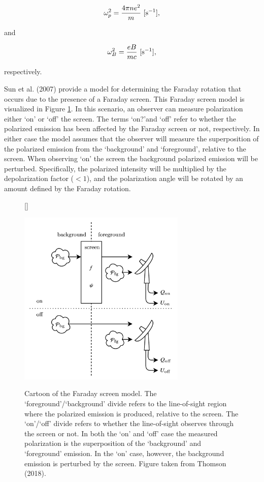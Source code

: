 \documentclass[a4paper,10pt]{article}
\begin{document}
\begin{align*}
	\omega_p^2 = \frac{4\pi ne^2}{m} ~ [{\rm s^{-1}}],
\end{align*}

{\noindent}and

\begin{align*}
	\omega_B^2 = \frac{eB}{mc} ~ [{\rm s^{-1}}],
\end{align*}

{\noindent}respectively.

{\noindent}Sun et al. (2007) provide a model for determining the Faraday rotation that occurs due to the presence of a Faraday screen. This Faraday screen model is visualized in Figure \ref{fig:faradayscreenmodel}. In this scenario, an observer can measure polarization either `on' or `off' the screen. The terms `on?'and `off' refer to whether the polarized emission has been affected by the Faraday screen or not, respectively. In either case the model assumes that the observer will measure the superposition of the polarized emission from the `background' and `foreground', relative to the screen. When observing `on' the screen the background polarized emission will be perturbed. Specifically, the polarized intensity will be multiplied by the depolarization factor ($<1$), and the polarization angle will be rotated by an amount defined by the Faraday rotation.

\begin{figure}[h]
    [\FBwidth]
    {\caption{\footnotesize{Cartoon of the Faraday screen model. The `foreground'/`background' divide refers to the line-of-sight region where the polarized emission is produced, relative to the screen. The `on'/`off' divide refers to whether the line-of-sight observes through the screen or not. In both the `on' and `off' case the measured polarization is the superposition of the `background' and `foreground' emission. In the `on' case, however, the background emission is perturbed by the screen. Figure taken from Thomson (2018).}}
    \label{fig:faradayscreenmodel}}
    {\includegraphics[width=8cm]{figures/FaradayScreenModel.png}}
\end{figure}
\end{document}
